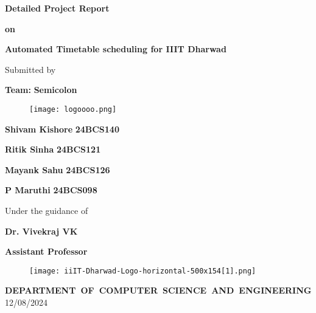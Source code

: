 \documentclass[12pt]{article}
\begin{document}
\begin{titlepage}
\doublespacing

\begin{center}
\par {\large \textbf{Detailed Project Report}}\\
\end{center}

\begin{center}
	\par {\large \textbf{on}}
\end{center}


\begin{center}
{\Large \textbf{Automated Timetable scheduling for IIIT Dharwad}}
\end{center}

{\small
\begin{center}
\par \small {Submitted by}
\par \Large \textbf{Team: }\textbf{Semicolon}

\begin{figure}
    \centering
    \texttt{[image: logoooo.png]}
    
\end{figure}

\par \large \textbf{Shivam Kishore} \textbf{24BCS140 }
\par \large \textbf{Ritik Sinha} \textbf{24BCS121 }
\par \large \textbf{Mayank Sahu} \textbf{24BCS126 }
\par \large \textbf{P Maruthi} \textbf{24BCS098 }

\par Under the guidance of
\par \large \textbf{ Dr. Vivekraj VK}
\par \textbf{Assistant Professor}
\end{center}
}

\begin{figure}[h]
\begin{center}
\texttt{[image: iiIT-Dharwad-Logo-horizontal-500x154[1].png]}
\end{center}
\end{figure}

\begin{center}
\par{\mbox {\small\textbf{DEPARTMENT OF COMPUTER SCIENCE AND ENGINEERING}}}
\\
12/08/2024

\end{center}
\end{titlepage}
\end{document}
